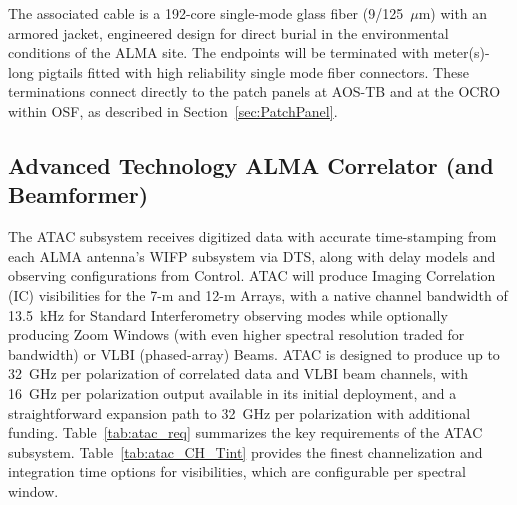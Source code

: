 The associated cable is a 192-core single-mode glass fiber (9/125~$\mu$m) with an armored jacket, engineered design for direct burial in the environmental conditions of the \ac{ALMA} site. The endpoints will be terminated with meter(s)-long pigtails fitted with high reliability single mode fiber connectors. 
These terminations connect directly to the patch panels at \ac{AOS}-TB and at the \ac{OCRO} within \ac{OSF}, as described in Section~\ref{sec:PatchPanel}.




\subsection{Advanced Technology ALMA Correlator (and Beamformer)}
\label{sec:ATAC}



The \ac{ATAC} subsystem receives digitized data with accurate time-stamping from each \ac{ALMA} antenna’s \ac{WIFP} subsystem via \ac{DTS}, along with delay models and observing configurations from Control. \ac{ATAC} will produce Imaging Correlation (IC) visibilities for the 7-m and 12-m Arrays, with a native channel bandwidth of 13.5~kHz for Standard Interferometry observing modes while optionally producing Zoom Windows (with even higher spectral resolution traded for bandwidth) or \ac{VLBI} (phased-array) 
Beams.
\ac{ATAC} is designed to produce up to 32~GHz per polarization of correlated data and \ac{VLBI} beam channels, with 16~GHz per polarization output available in its initial deployment, and a straightforward expansion path to 32~GHz per polarization with additional funding. 
Table~\ref{tab:atac_req} summarizes the key requirements of the \ac{ATAC} subsystem. Table~\ref{tab:atac_CH_Tint} provides the finest channelization and integration time options for visibilities, which are configurable per spectral window.

